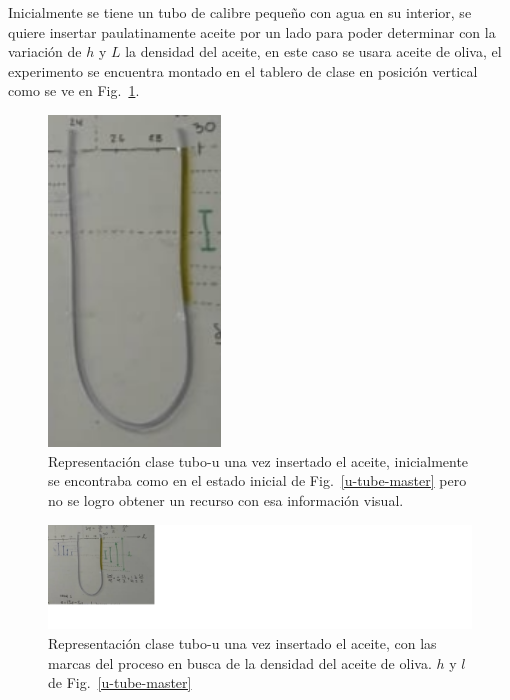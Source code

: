 Inicialmente se tiene un tubo de calibre pequeño con agua en su interior, se quiere insertar paulatinamente aceite por un lado para poder determinar con la variación de $h$ y $L$ la densidad del aceite, en este caso se usara aceite de oliva, el experimento se encuentra montado en el tablero de clase en posición vertical como se ve en Fig.~\ref{u-tube-master-class}.

\begin{figure}[htbp]
  \begin{center}
  \includegraphics[width=1.8in]{photo/u-tube-class.png}
  \caption{Representación clase tubo-u una vez insertado el aceite, inicialmente se encontraba como en el estado inicial de Fig.~\ref{u-tube-master} pero no se logro obtener un recurso con esa información visual.}\label{u-tube-master-class}
  \end{center}
\end{figure}

\begin{figure}[htbp]
  \begin{center}
  \includegraphics[width=12in]{photo/u-tube-class-marks.png}
  \caption{Representación clase tubo-u una vez insertado el aceite, con las marcas del proceso en busca de la densidad del aceite de oliva. $h$ y $l$ de Fig.~\ref{u-tube-master} }\label{u-tube-master-class-marks}
  \end{center}
\end{figure}

